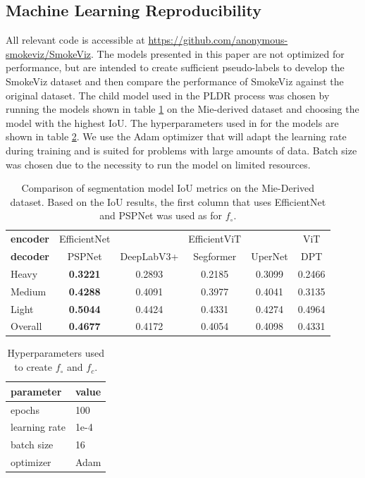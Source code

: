 \documentclass{article}
\begin{document}
\subsection{Machine Learning Reproducibility}

All relevant code is accessible at \url{https://github.com/anonymous-smokeviz/SmokeViz}. The models presented in this paper are not optimized for performance, but are intended to create sufficient pseudo-labels to develop the SmokeViz dataset and then compare the performance of SmokeViz against the original dataset. The child model used in the PLDR process was chosen by running the models shown in table \ref{child} on the Mie-derived dataset and choosing the model with the highest IoU. The hyperparameters used in for the models are shown in table \ref{hyper}. We use the Adam optimizer that will adapt the learning rate during training and is suited for problems with large amounts of data. Batch size was chosen due to the necessity to run the model on limited resources. 

\begin{table}[!htb] 
    \caption{Comparison of segmentation model IoU metrics on the Mie-Derived dataset. Based on the IoU results, the first column that uses EfficientNet and PSPNet was used as for \(f_{\circ}\).}\label{child}
    \centering
    \begin{tabular}{lccccc}
        \toprule
        \textbf{encoder} & EfficientNet\cite{efficientnetv2} & \cite{efficientnetv2} & EfficientViT\cite{efficientvit} & \cite{efficientvit}& ViT \cite{vit} \\
        \textbf{decoder} &  PSPNet\cite{pspnet} & DeepLabV3+\cite{deeplab} & Segformer\cite{segformer} & UperNet \cite{upernet}& DPT\cite{dpt} \\
        \midrule
        Heavy   &	\textbf{0.3221}	& 0.2893	&	0.2185	&	0.3099	&	0.2466 \\
        Medium  &	\textbf{0.4288}	& 0.4091	&	0.3977	&   0.4041	&	0.3135 \\
        Light   &	\textbf{0.5044}	& 0.4424	&	0.4331	&	0.4274	&	0.4964 \\
        Overall &	\textbf{0.4677}	& 0.4172	&   0.4054	&	0.4098	&	0.4331 \\
        \bottomrule
    \end{tabular}
\end{table}

\begin{table}
    \caption{Hyperparameters used to create \(f_{\circ}\) and \(f_{c}\).}
  \label{hyper}
  \centering
  \begin{tabular}{ll}
    \toprule
    parameter & value \\ 
    \midrule
    epochs & 100 \\
    learning rate & 1e-4 \\
    batch size & 16 \\
    optimizer & Adam \\
    \bottomrule
  \end{tabular}
\end{table}



\end{document}
